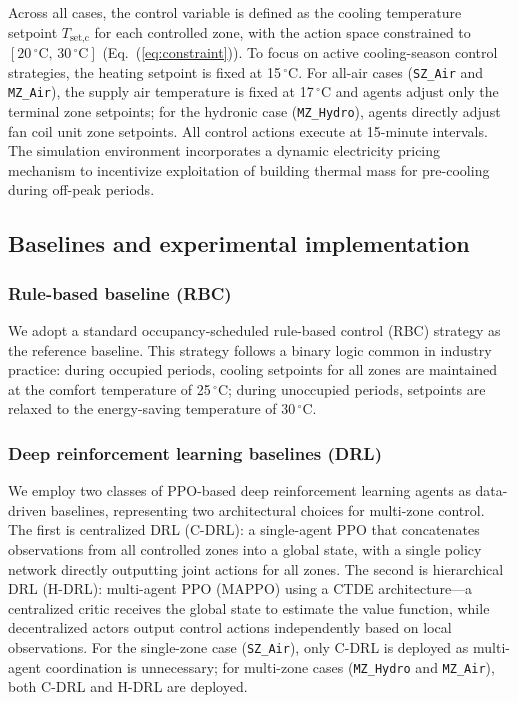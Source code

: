 \documentclass[a4paper]{cas-sc}
\begin{document}
Across all cases, the control variable is defined as the cooling temperature setpoint $T_{\text{set,c}}$ for each controlled zone, with the action space constrained to $[20\,^{\circ}\text{C},\,30\,^{\circ}\text{C}]$ (Eq.~(\ref{eq:constraint})). To focus on active cooling-season control strategies, the heating setpoint is fixed at 15\,$^{\circ}$C. For all-air cases (\texttt{SZ\_Air} and \texttt{MZ\_Air}), the supply air temperature is fixed at 17\,$^{\circ}$C and agents adjust only the terminal zone setpoints; for the hydronic case (\texttt{MZ\_Hydro}), agents directly adjust fan coil unit zone setpoints. All control actions execute at 15-minute intervals. The simulation environment incorporates a dynamic electricity pricing mechanism to incentivize exploitation of building thermal mass for pre-cooling during off-peak periods.

\subsection{Baselines and experimental implementation}

\subsubsection{Rule-based baseline (RBC)}

We adopt a standard occupancy-scheduled rule-based control (RBC) strategy as the reference baseline. This strategy follows a binary logic common in industry practice: during occupied periods, cooling setpoints for all zones are maintained at the comfort temperature of 25\,$^{\circ}$C; during unoccupied periods, setpoints are relaxed to the energy-saving temperature of 30\,$^{\circ}$C.

\subsubsection{Deep reinforcement learning baselines (DRL)}

We employ two classes of PPO-based deep reinforcement learning agents as data-driven baselines, representing two architectural choices for multi-zone control. The first is centralized DRL (C-DRL): a single-agent PPO that concatenates observations from all controlled zones into a global state, with a single policy network directly outputting joint actions for all zones. The second is hierarchical DRL (H-DRL): multi-agent PPO (MAPPO) using a CTDE architecture---a centralized critic receives the global state to estimate the value function, while decentralized actors output control actions independently based on local observations. For the single-zone case (\texttt{SZ\_Air}), only C-DRL is deployed as multi-agent coordination is unnecessary; for multi-zone cases (\texttt{MZ\_Hydro} and \texttt{MZ\_Air}), both C-DRL and H-DRL are deployed.
\end{document}
